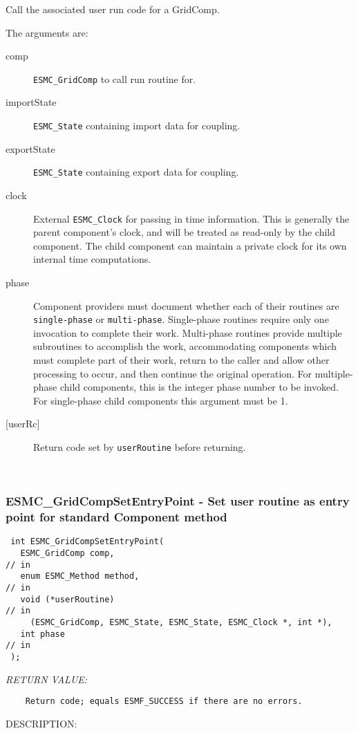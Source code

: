   
    Call the associated user run code for a GridComp.
  
    The arguments are:
    \begin{description}
    \item[comp]
      {\tt ESMC\_GridComp} to call run routine for.
    \item[importState]
      {\tt ESMC\_State} containing import data for coupling.
    \item[exportState]
      {\tt ESMC\_State} containing export data for coupling.
    \item[clock]
      External {\tt ESMC\_Clock} for passing in time information. This is 
      generally the parent component's clock, and will be treated as read-only
      by the child component. The child component can maintain a private clock
      for its own internal time computations.
    \item[phase]
      Component providers must document whether each of their routines are 
      {\tt single-phase} or {\tt multi-phase}. Single-phase routines require 
      only one invocation to complete their work. Multi-phase routines provide
      multiple subroutines to accomplish the work, accommodating components
      which must complete part of their work, return to the caller and allow 
      other processing to occur, and then continue the original operation. 
      For multiple-phase child components, this is the integer phase number to
      be invoked. For single-phase child components this argument must be 1.
    \item[{[userRc]}]
      Return code set by {\tt userRoutine} before returning.
    \end{description}
   
 
\mbox{}\hrulefill\ 
 
\subsubsection [ESMC\_GridCompSetEntryPoint] {ESMC\_GridCompSetEntryPoint - Set user routine as entry point for standard Component method}


  
\begin{verbatim} int ESMC_GridCompSetEntryPoint(
   ESMC_GridComp comp,                                               // in
   enum ESMC_Method method,                                          // in
   void (*userRoutine)                                               // in
     (ESMC_GridComp, ESMC_State, ESMC_State, ESMC_Clock *, int *),
   int phase                                                         // in
 );\end{verbatim}{\em RETURN VALUE:}
\begin{verbatim}    Return code; equals ESMF_SUCCESS if there are no errors.\end{verbatim}
{\sf DESCRIPTION:\\ }


